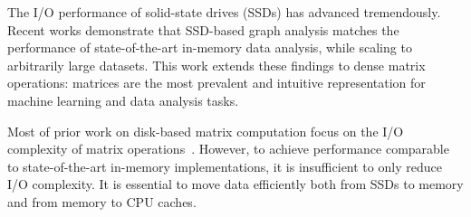 

The I/O performance of solid-state drives (SSDs) has advanced tremendously.
Recent works \cite{flashgraph, gridgraph} demonstrate that SSD-based 
graph analysis matches the performance of 
state-of-the-art in-memory data analysis, while scaling to arbitrarily large datasets.
This work extends these findings to dense matrix operations: matrices are the most
prevalent and intuitive representation for machine learning and data analysis tasks.





Most of prior work on disk-based matrix computation focus on the I/O
complexity of matrix operations~\cite{}. However, to achieve performance
comparable to state-of-the-art in-memory implementations, it is insufficient
to only reduce I/O complexity. It is essential
to move data efficiently both from SSDs to memory and from memory to CPU
caches.



